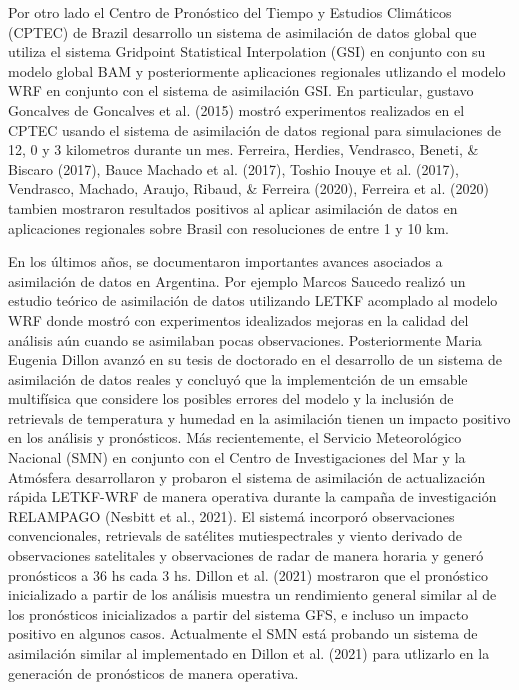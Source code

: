 \documentclass[12pt,twoside]{reedthesis}
\begin{document}
Por otro lado el Centro de Pronóstico del Tiempo y Estudios Climáticos (CPTEC) de Brazil desarrollo un sistema de asimilación de datos global que utiliza el sistema Gridpoint Statistical Interpolation (GSI) en conjunto con su modelo global BAM y posteriormente aplicaciones regionales utlizando el modelo WRF en conjunto con el sistema de asimilación GSI. En particular, gustavo Goncalves de Goncalves et al. (2015) mostró experimentos realizados en el CPTEC usando el sistema de asimilación de datos regional para simulaciones de 12, 0 y 3 kilometros durante un mes. Ferreira, Herdies, Vendrasco, Beneti, \& Biscaro (2017), Bauce Machado et al. (2017), Toshio Inouye et al. (2017), Vendrasco, Machado, Araujo, Ribaud, \& Ferreira (2020), Ferreira et al. (2020) tambien mostraron resultados positivos al aplicar asimilación de datos en aplicaciones regionales sobre Brasil con resoluciones de entre 1 y 10 km.

En los últimos años, se documentaron importantes avances asociados a asimilación de datos en Argentina. Por ejemplo Marcos Saucedo realizó un estudio teórico de asimilación de datos utilizando LETKF acomplado al modelo WRF donde mostró con experimentos idealizados mejoras en la calidad del análisis aún cuando se asimilaban pocas observaciones. Posteriormente Maria Eugenia Dillon avanzó en su tesis de doctorado en el desarrollo de un sistema de asimilación de datos reales y concluyó que la implementción de un emsable multifísica que considere los posibles errores del modelo y la inclusión de retrievals de temperatura y humedad en la asimilación tienen un impacto positivo en los análisis y pronósticos. Más recientemente, el Servicio Meteorológico Nacional (SMN) en conjunto con el Centro de Investigaciones del Mar y la Atmósfera desarrollaron y probaron el sistema de asimilación de actualización rápida LETKF-WRF de manera operativa durante la campaña de investigación RELAMPAGO (Nesbitt et al., 2021). El sistemá incorporó observaciones convencionales, retrievals de satélites mutiespectrales y viento derivado de observaciones satelitales y observaciones de radar de manera horaria y generó pronósticos a 36 hs cada 3 hs. Dillon et al. (2021) mostraron que el pronóstico inicializado a partir de los análisis muestra un rendimiento general similar al de los pronósticos inicializados a partir del sistema GFS, e incluso un impacto positivo en algunos casos. Actualmente el SMN está probando un sistema de asimilación similar al implementado en Dillon et al. (2021) para utlizarlo en la generación de pronósticos de manera operativa.
\end{document}
